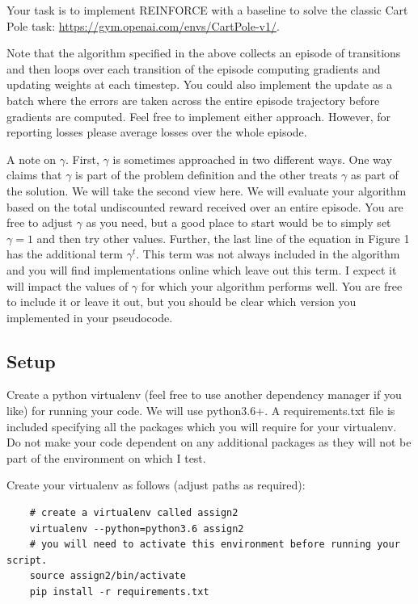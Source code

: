 \documentclass{article}
\begin{document}
Your task is to implement REINFORCE with a baseline to solve the classic Cart Pole task: \url{https://gym.openai.com/envs/CartPole-v1/}.

Note that the algorithm specified in the above collects an episode of transitions and then loops over each transition of the episode computing gradients and updating weights at each timestep. You could also implement the update as a batch where the errors are taken across the entire episode trajectory before gradients are computed. Feel free to implement either approach. However, for reporting losses please average losses over the whole episode.

A note on $\gamma$. First, $\gamma$ is sometimes approached in two different ways. One way claims that $\gamma$ is part of the problem definition and the other treats $\gamma$ as part of the solution. We will take the second view here. We will evaluate your algorithm based on the total undiscounted reward received over an entire episode. You are free to adjust $\gamma$ as you need, but a good place to start would be to simply set $\gamma=1$ and then try other values. Further, the last line of the equation in Figure 1 has the additional term $\gamma^t$. This term was not always included in the algorithm and you will find implementations online which leave out this term. I expect it will impact the values of $\gamma$ for which your algorithm performs well. You are free to include it or leave it out, but you should be clear which version you implemented in your pseudocode.

\subsection{Setup}

Create a python virtualenv (feel free to use another dependency manager if you like) for running your code. We will use python3.6+. A requirements.txt file is included specifying all the packages which you will require for your virtualenv. Do not make your code dependent on any additional packages as they will not be part of the environment on which I test.

Create your virtualenv as follows (adjust paths as required):

\begin{verbatim}
    # create a virtualenv called assign2
    virtualenv --python=python3.6 assign2
    # you will need to activate this environment before running your script.
    source assign2/bin/activate
    pip install -r requirements.txt
\end{verbatim}
\end{document}
